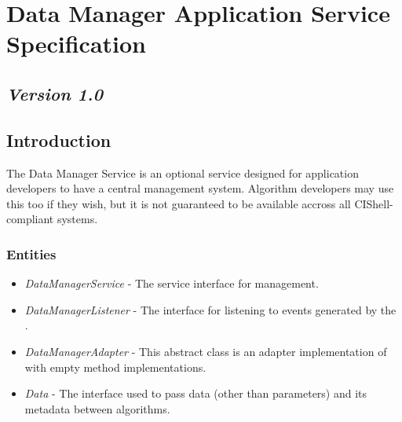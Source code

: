 \chapter{Data Manager Application Service Specification}

\section*{\textit{Version 1.0}}

\section{Introduction}

The Data Manager Service is an optional service designed for application
developers to have a central  management system. Algorithm
developers may use this too if they wish, but it is not guaranteed to be
available accross all CIShell-compliant systems.

\subsection{Entities}

\begin{itemize}
  \item \textit{DataManagerService} - The service interface for 
  management.
  \item \textit{DataManagerListener} - The interface for listening to events
  generated by the .
  \item \textit{DataManagerAdapter} - This abstract class is an adapter
  implementation of  with empty method
  implementations.
  \item \textit{Data} - The interface used to pass data (other than
  parameters) and its metadata between algorithms.
\end{itemize}

\orgcishellappservicedatamanager{}
